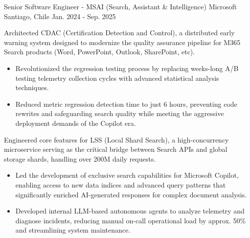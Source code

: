 

\begin{cventries}
  \cventry
    {Senior Software Engineer - MSAI (Search, Assistant \& Intelligence)} %
    {Microsoft} %
    {Santiago, Chile} %
    {Jan. 2024 - Sep. 2025} %
    {
        \begin{cvitems}
            \item {
                Architected CDAC (Certification Detection and Control), a distributed early warning system designed to modernize the quality assurance pipeline for M365 Search products (Word, PowerPoint, Outlook, SharePoint, etc).
                  \begin{itemize}
                    \item {Revolutionized the regression testing process by replacing weeks-long A/B testing telemetry collection cycles with advanced statistical analysis techniques.}
                    \item {Reduced metric regression detection time to just 6 hours, preventing code rewrites and safeguarding search quality while meeting the aggressive deployment demands of the Copilot era.}
                  \end{itemize}
            }
            \item {
              Engineered core features for LSS (Local Shard Search), a high-concurrency microservice serving as the critical bridge between Search APIs and global storage shards, handling over 200M daily requests.
              \begin{itemize}
                \item {Led the development of exclusive search capabilities for Microsoft Copilot, enabling access to new data indices and advanced query patterns that significantly enriched AI-generated responses for complex document analysis.}
                \item {Developed internal LLM-based autonomous agents to analyze telemetry and diagnose incidents, reducing manual on-call operational load by approx. 50\% and streamlining system maintenance.}

\end{itemize}}
\end{cvitems}}
\end{cventries}
